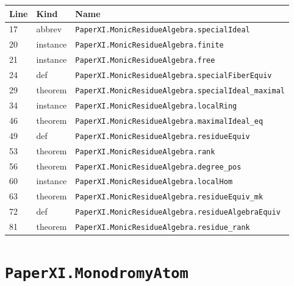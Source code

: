 \documentclass[10pt,oneside]{book}
\begin{document}
\begin{longtable}{@{}p{}p{}p{}@{}}\toprule Line&Kind&Name\\\midrule\endhead

17&abbrev&\nolinkurl{PaperXI.MonicResidueAlgebra.specialIdeal}\\

20&instance&\nolinkurl{PaperXI.MonicResidueAlgebra.finite}\\

21&instance&\nolinkurl{PaperXI.MonicResidueAlgebra.free}\\

24&def&\nolinkurl{PaperXI.MonicResidueAlgebra.specialFiberEquiv}\\

29&theorem&\nolinkurl{PaperXI.MonicResidueAlgebra.specialIdeal_maximal}\\

34&instance&\nolinkurl{PaperXI.MonicResidueAlgebra.localRing}\\

46&theorem&\nolinkurl{PaperXI.MonicResidueAlgebra.maximalIdeal_eq}\\

49&def&\nolinkurl{PaperXI.MonicResidueAlgebra.residueEquiv}\\

53&theorem&\nolinkurl{PaperXI.MonicResidueAlgebra.rank}\\

56&theorem&\nolinkurl{PaperXI.MonicResidueAlgebra.degree_pos}\\

60&instance&\nolinkurl{PaperXI.MonicResidueAlgebra.localHom}\\

63&theorem&\nolinkurl{PaperXI.MonicResidueAlgebra.residueEquiv_mk}\\

72&def&\nolinkurl{PaperXI.MonicResidueAlgebra.residueAlgebraEquiv}\\

81&theorem&\nolinkurl{PaperXI.MonicResidueAlgebra.residue_rank}\\

\bottomrule\end{longtable}

\section{\texorpdfstring{\nolinkurl{PaperXI.MonodromyAtom}}{PaperXI.MonodromyAtom}}\label{module:PaperXI.MonodromyAtom}
\end{document}
